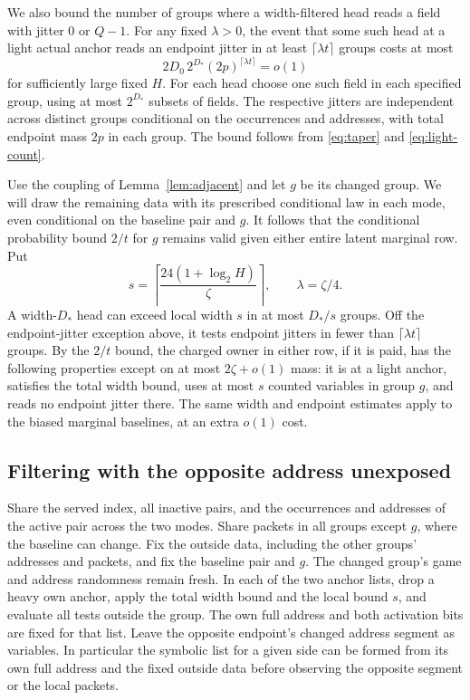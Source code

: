 \documentclass[11pt]{article}
\begin{document}
We also bound the number of groups where a width-filtered head reads
a field with jitter $0$ or $Q-1$. For any fixed $\lambda>0$, the event
that some such head at a light actual anchor reads an endpoint jitter
in at least $\lceil\lambda t\rceil$ groups costs at most
\[
  2D_0\,2^{D_*}(2p)^{\lceil\lambda t\rceil}=o(1)
\]
for sufficiently large fixed $H$. For each head choose one such field
in each specified group, using at most $2^{D_*}$ subsets of fields.
The respective jitters are independent across distinct groups
conditional on the occurrences and addresses, with total endpoint
mass $2p$ in each group. The bound follows from \eqref{eq:taper}
and \eqref{eq:light-count}.

Use the coupling of Lemma~\ref{lem:adjacent} and let $g$ be its changed
group. We will draw the remaining data with its prescribed conditional
law in each mode, even conditional on the baseline pair and $g$.
It follows that the conditional probability bound $2/t$ for $g$ remains
valid given either entire latent marginal row. Put
\[
  s=\left\lceil\frac{24(1+\log_2 H)}{\zeta}\right\rceil,
  \qquad \lambda=\zeta/4 .
\]
A width-$D_*$ head can exceed local width $s$ in at most $D_*/s$
groups. Off the endpoint-jitter exception above, it tests endpoint
jitters in fewer than $\lceil\lambda t\rceil$ groups. By the $2/t$
bound, the charged owner in either row, if it is paid, has the
following properties except on at most $2\zeta+o(1)$ mass: it is
at a light anchor, satisfies the total width bound, uses at most $s$
counted variables in group $g$, and reads no endpoint jitter there.
The same width and endpoint estimates apply to the biased marginal
baselines, at an extra $o(1)$ cost.

\subsection{Filtering with the opposite address unexposed}\label{sec:selection}

Share the served index, all inactive pairs, and the occurrences and
addresses of the active pair across the two modes. Share packets in
all groups except $g$, where the baseline can change. Fix the outside
data, including the other groups' addresses and packets, and fix the
baseline pair and $g$. The changed group's game and address randomness
remain fresh. In each of the two anchor lists, drop a heavy own anchor,
apply the total width bound and the local bound $s$, and evaluate all
tests outside the group. The own full address and both activation bits
are fixed for that list. Leave the opposite endpoint's changed
address segment as variables. In particular the symbolic list for a
given side can be formed from its own full address and the fixed
outside data before observing the opposite segment or the local
packets.
\end{document}
